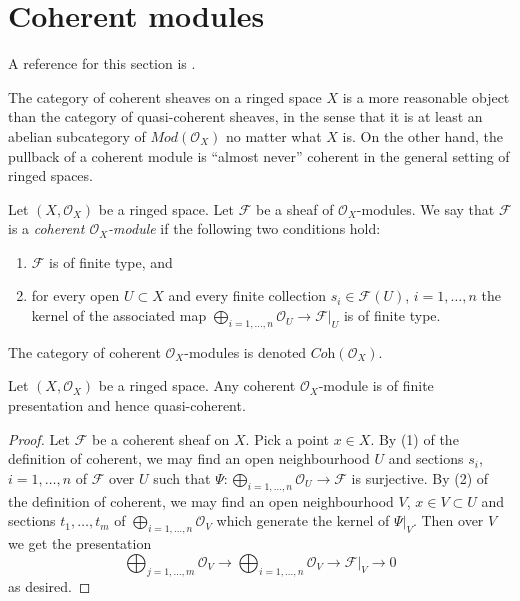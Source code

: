 \section{Coherent modules}
\label{section-coherent}

\noindent
A reference for this section is \cite{FAC}.

\medskip\noindent
The category of coherent sheaves on a ringed space $X$
is a more reasonable object
than the category of quasi-coherent sheaves, in the sense
that it is at least an abelian subcategory of $\textit{Mod}(\mathcal{O}_X)$
no matter what $X$ is. On the other hand, the pullback of a
coherent module is ``almost never'' coherent in the general setting
of ringed spaces.

\begin{definition}
\label{definition-coherent}
\begin{reference}
\cite[Chapter I, \S 2, no. 12, Definition 2, p. 208]{FAC}
\cite[Chapter I, \S 2, no. 15, Definition 3, p. 210]{FAC}
\cite[Chapter II, \S 2, no. 38, p. 231]{FAC}
\end{reference}
Let $(X, \mathcal{O}_X)$ be a ringed space.
Let $\mathcal{F}$ be a sheaf of $\mathcal{O}_X$-modules.
We say that $\mathcal{F}$ is a {\it coherent $\mathcal{O}_X$-module}
if the following two conditions hold:
\begin{enumerate}
\item $\mathcal{F}$ is of finite type, and
\item for every open $U \subset X$ and every finite
collection $s_i \in \mathcal{F}(U)$, $i = 1, \ldots, n$
the kernel of the associated map
$\bigoplus_{i = 1, \ldots, n} \mathcal{O}_U \to \mathcal{F}|_U$
is of finite type.
\end{enumerate}
The category of coherent $\mathcal{O}_X$-modules is denoted
$\textit{Coh}(\mathcal{O}_X)$.
\end{definition}

\begin{lemma}
\label{lemma-coherent-finite-presentation}
\begin{reference}
\cite[Chapter I, \S 2, no. 12, Proposition 2, p. 208]{FAC}
\end{reference}
Let $(X, \mathcal{O}_X)$ be a ringed space.
Any coherent $\mathcal{O}_X$-module is of finite presentation
and hence quasi-coherent.
\end{lemma}

\begin{proof}
Let $\mathcal{F}$ be a coherent sheaf on $X$.
Pick a point $x \in X$.
By (1) of the definition of coherent, we may find an open neighbourhood $U$
and sections $s_i$, $i = 1, \ldots, n$ of $\mathcal{F}$ over $U$
such that $\Psi : \bigoplus_{i = 1, \ldots, n} \mathcal{O}_U \to \mathcal{F}$
is surjective. By (2) of the definition of coherent, we may find
an open neighbourhood $V$, $x \in V \subset U$ and sections
$t_1, \ldots, t_m$ of $\bigoplus_{i = 1, \ldots, n} \mathcal{O}_V$
which generate the kernel of $\Psi|_V$. Then over $V$ we get the
presentation
$$
\bigoplus\nolimits_{j = 1, \ldots, m}
\mathcal{O}_V
\longrightarrow
\bigoplus\nolimits_{i = 1, \ldots, n}
\mathcal{O}_V
\to
\mathcal{F}|_V
\to
0
$$
as desired.
\end{proof}

